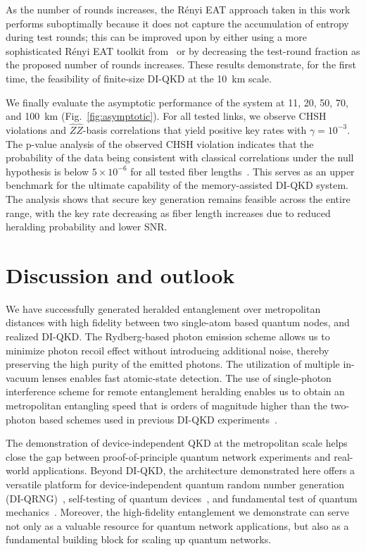 \documentclass[aps,reprint,showpacs,superscriptaddress]{revtex4-2}
\begin{document}
As the number of rounds increases, the R\'{e}nyi EAT approach taken in this work performs suboptimally because it does not capture the accumulation of entropy during test rounds; this can be improved upon by either using a more sophisticated R\'{e}nyi EAT toolkit from~\cite{arq2024generalized} or by decreasing the test-round fraction as the proposed number of rounds increases. These results demonstrate, for the first time, the feasibility of finite-size DI-QKD at the 10~km scale.

We finally evaluate the asymptotic performance of the system at 11, 20, 50, 70, and 100~km (Fig.~\ref{fig:asymptotic}). For all tested links, we observe CHSH violations and $\hat{Z}\hat{Z}$-basis correlations that yield positive key rates with $\gamma = 10^{-3}$. The p-value analysis of the observed CHSH violation indicates that the probability of the data being consistent with classical correlations under the null hypothesis is below $5\times10^{-6}$ for all tested fiber lengths~\cite{SM}. This serves as an upper benchmark for the ultimate capability of the memory-assisted DI-QKD system. The analysis shows that secure key generation remains feasible across the entire range, with the key rate decreasing as fiber length increases due to reduced heralding probability and lower SNR.


\section*{Discussion and outlook}
We have successfully generated heralded entanglement over metropolitan distances with high fidelity between two single-atom based quantum nodes, and realized DI-QKD. The Rydberg-based photon emission scheme allows us to minimize photon recoil effect without introducing additional noise, thereby preserving the high purity of the emitted photons. The utilization of multiple in-vacuum lenses enables fast atomic-state detection. The use of single-photon interference scheme for remote entanglement heralding enables us to obtain an metropolitan entangling speed that is orders of magnitude higher than the two-photon based schemes used in previous DI-QKD experiments~\cite{nadlinger2022experimental,zhang2022device}.

The demonstration of device-independent QKD at the metropolitan scale helps close the gap between proof-of-principle quantum network experiments and real-world applications. Beyond DI-QKD, the architecture demonstrated here offers a versatile platform for device-independent quantum random number generation (DI-QRNG)~\cite{MayersYao1998Quantum}, self-testing of quantum devices~\cite{vsupic2020self}, and fundamental test of quantum mechanics~\cite{hensen2015loophole,rosenfeld2017event,giustina2015significant,shalm2015strong}. Moreover, the high-fidelity entanglement we demonstrate can serve not only as a valuable resource for quantum network applications, but also as a fundamental building block for scaling up quantum networks.
\end{document}
